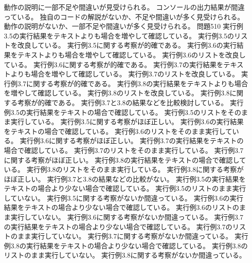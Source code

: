 {{	{動作の説明に一部不足や間違いが見受けられる。}
	}
	{
  {コンソールの出力結果が間違っている。}
	{独自のコードの解説がないか、不足や間違いが多く見受けられる。}
	{動作の説明がないか、一部不足や間違いが多く見受けられる。}
	}
{問題5}{10}{
  {実行例3.5の実行結果をテキストよりも場合を増やして確認している。}
  {実行例3.5のリストを改良している。}
  {実行例3.5に関する考察が的確である。}
  {実行例3.6の実行結果をテキストよりも場合を増やして確認している。}
  {実行例3.6のリストを改良している。}
  {実行例3.6に関する考察が的確である。}
  {実行例3.7の実行結果をテキストよりも場合を増やして確認している。}
  {実行例3.7のリストを改良している。}
  {実行例3.7に関する考察が的確である。}
  {実行例3.8の実行結果をテキストよりも場合を増やして確認している。}
  {実行例3.8のリストを改良している。}
  {実行例3.8に関する考察が的確である。}
  {実行例3.7と3.8の結果などを比較検討している。}
	}
	{
  {実行例3.5の実行結果をテキストの場合で確認している。}
  {実行例3.5のリストをそのまま実行している。}
  {実行例3.5に関する考察がほぼ正しい。}
  {実行例3.6の実行結果をテキストの場合で確認している。}
  {実行例3.6のリストをそのまま実行している。}
  {実行例3.6に関する考察がほぼ正しい。}
  {実行例3.7の実行結果をテキストの場合で確認している。}
  {実行例3.7のリストをそのまま実行している。}
  {実行例3.7に関する考察がほぼ正しい。}
  {実行例3.8の実行結果をテキストの場合で確認している。}
  {実行例3.8のリストをそのまま実行している。}
  {実行例3.8に関する考察がほぼ正しい。}
  {実行例3.7と3.8の結果などの比較がない。}
	}
	{
  {実行例3.5の実行結果をテキストの場合より少ない場合で確認している。}
  {実行例3.5のリストのまま実行していない。}
  {実行例3.5に関する考察がないか間違っている。}
  {実行例3.6の実行結果をテキストの場合より少ない場合で確認している。}
  {実行例3.6のリストのまま実行していない。}
  {実行例3.6に関する考察がないか間違っている。}
  {実行例3.7の実行結果をテキストの場合より少ない場合で確認している。}
  {実行例3.7のリストのまま実行していない。}
  {実行例3.7に関する考察がないか間違っている。}
  {実行例3.8の実行結果をテキストの場合より少ない場合で確認している。}
  {実行例3.8のリストのまま実行していない。}
  {実行例3.8に関する考察がないか間違っている。}
	}
}